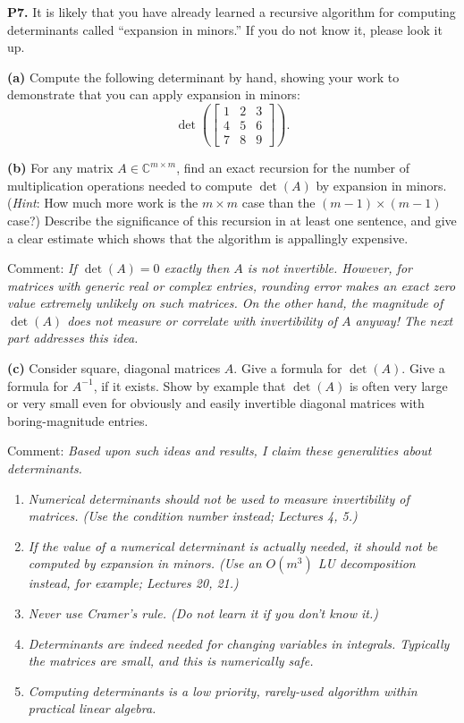 \documentclass[12pt]{amsart}
\newcommand{\CC}{\mathbb{C}}
\newcommand{\prob}[1]{\bigskip\noindent\textbf{#1.}\quad }
\newcommand{\epart}[1]{\medskip\noindent\textbf{(#1)}\quad }
\begin{document}
\prob{P7}  It is likely that you have already learned a recursive algorithm for computing determinants called ``expansion in minors.''  If you do not know it, please look it up.

\epart{a} Compute the following determinant by hand, showing your work to demonstrate that you can apply expansion in minors:
	$$\det\left(\begin{bmatrix} 1 & 2 & 3 \\ 4 & 5 & 6 \\ 7 & 8 & 9 \end{bmatrix}\right).$$

\epart{b} For any matrix $A\in\CC^{m\times m}$, find an exact recursion for the number of multiplication operations needed to compute $\det(A)$ by expansion in minors.  (\emph{Hint}:  How much more work is the $m\times m$ case than the $(m-1)\times (m-1)$ case?)  Describe the significance of this recursion in at least one sentence, and give a clear estimate which shows that the algorithm is appallingly expensive.

\smallskip
\noindent Comment: \emph{If $\det(A)=0$ \emph{exactly} then $A$ is not invertible.  However, for matrices with generic real or complex entries, rounding error makes an exact zero value extremely unlikely on such matrices.  On the other hand, the magnitude of $\det(A)$ does not measure or correlate with invertibility of $A$ anyway!  The next part addresses this idea.}

\smallskip
\epart{c}  Consider square, diagonal matrices $A$.  Give a formula for $\det(A)$.  Give a formula for $A^{-1}$, if it exists.  Show by example that $\det(A)$ is often very large or very small even for obviously and easily invertible diagonal matrices with boring-magnitude entries.

\medskip
\medskip
\noindent Comment: \emph{Based upon such ideas and results, I claim these generalities about determinants.}

\smallskip
\renewcommand{\labelenumi}{\arabic{enumi}.}
\begin{enumerate}
\setlength\itemsep{5pt}
\item \emph{Numerical determinants should not be used to measure invertibility of matrices.  (\emph{Use the condition number instead; Lectures 4, 5.})}
\item \emph{If the value of a numerical determinant is actually needed, it should not be computed by expansion in minors.  (\emph{Use an $O(m^3)$ LU decomposition instead, for example; Lectures 20, 21.})}
\item \emph{Never use Cramer's rule.  (\emph{Do not learn it if you don't know it.})}
\item \emph{Determinants \emph{are} indeed needed for changing variables in integrals.  Typically the matrices are small, and this is numerically safe.}
\item \emph{Computing determinants is a low priority, rarely-used algorithm within practical linear algebra.}
\end{enumerate}
\end{document}
